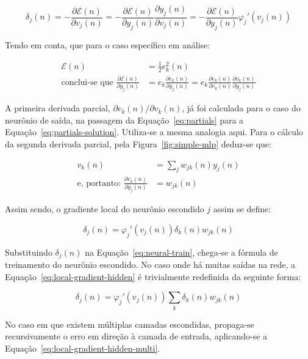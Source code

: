 \begin{equation}
\delta_j(n) = -\frac{\partial\mathcal{E}(n)}{\partial
v_j(n)} = -\frac{\partial\mathcal{E}(n)}{\partial
y_j(n)}\frac{\partial y_j(n)}{\partial v_j(n)} =
-\frac{\partial\mathcal{E}(n)}{\partial y_j(n)}\varphi_{j}'(v_j(n))
\end{equation}

Tendo em conta, que para o caso específico em análise:

\begin{align}
\mathcal{E}(n) &= \frac{1}{2}e_{k}^{2}(n) \\
\text{conclui-se que } \frac{\partial\mathcal{E}(n)}{\partial y_j(n)} &=
e_{k}\frac{\partial e_k(n)}{\partial y_j(n)} = e_{k}\frac{\partial
e_k(n)}{\partial v_k(n)}\frac{\partial v_k(n)}{\partial y_j(n)}
\end{align}

A primeira derivada parcial, $\partial e_k(n)/\partial v_k(n)$, já foi
calculada para o caso do neurônio de saída, na passagem da
Equação~\ref{eq:partials} para a
Equação~\ref{eq:partials-solution}. Utiliza-se a mesma analogia aqui. Para o
cálculo da segunda derivada parcial, pela Figura~\ref{fig:simple-mlp}
deduz-se que:

\begin{align}
v_k(n) &= \sum_{j} w_{jk}(n)y_j(n) \\
\text{e, portanto: } \frac{\partial v_k(n)}{\partial y_j(n)} &= w_{jk}(n)
\end{align}

Assim sendo, o gradiente local do neurônio escondido $j$ assim se define:

\begin{equation}
\delta_j(n) = \varphi_{j}'(v_j(n))\delta_k(n)w_{jk}(n)
\label{eq:local-gradient-hidden}
\end{equation}

Substituindo $\delta_j(n)$ na Equação~\ref{eq:neural-train}, chega-se a
fórmula de treinamento do neurônio escondido. No caso onde há muitas saídas na
rede, a Equação~\ref{eq:local-gradient-hidden} é trivialmente redefinida da
seguinte forma: 

\begin{equation}
\delta_j(n) = \varphi_{j}'(v_j(n))\sum_{k}\delta_k(n)w_{jk}(n)
\label{eq:local-gradient-hidden-multi}
\end{equation}

No caso em que existem múltiplas camadas escondidas, propaga-se recursivamente
o erro em direção à camada de entrada, aplicando-se a
Equação~\ref{eq:local-gradient-hidden-multi}. 


